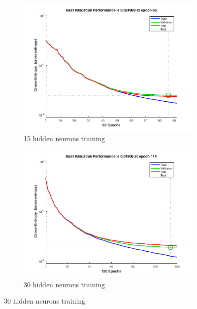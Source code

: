 \begin{figure}
  \begin{subfigure}[t]{.5\textwidth}
    \centering
	\includegraphics[width=\linewidth]{../../pracs/week7/images/15_hidden_neurons}
	\caption{15 hidden neurons training}
  \end{subfigure}
  \hfill
  \begin{subfigure}[t]{.5\textwidth}
    \centering
	\includegraphics[width=\linewidth]{../../pracs/week7/images/30_hidden_neurons}
	\caption{30 hidden neurons training}
  \end{subfigure}

  \medskip


\end{figure}
